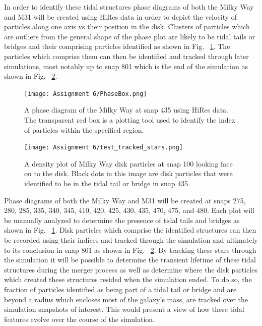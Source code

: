 \documentclass[fleqn,usenatbib]{mnras}
\begin{document}
In order to identify these tidal structures phase diagrams of both the Milky Way and M31 will be created using HiRes data in order to depict the velocity of particles along one axis vs their position in the disk. Clusters of particles which are outliers from the general shape of the phase plot are likely to be tidal tails or bridges and their comprising particles identified as shown in Fig. ~\ref{fig:Phase_box}. The particles which comprise them can then be identified and tracked through later simulations, most notably up to snap 801 which is the end of the simulation as shown in Fig. ~\ref{fig:Tracked_Stars}.

\begin{figure}
	\texttt{[image: Assignment 6/PhaseBox.png]}
    \caption{A phase diagram of the Milky Way at snap 435 using HiRes data. The transparent red box is a plotting tool used to identify the index of particles within the specified region.}
    \label{fig:Phase_box}
\end{figure}

\begin{figure}
	\texttt{[image: Assignment 6/test\_tracked\_stars.png]}
    \caption{A density plot of Milky Way disk particles at snap 100 looking face on to the disk. Black dots in this image are disk particles that were identified to be in the tidal tail or bridge in snap 435.}
    \label{fig:Tracked_Stars}
\end{figure}

 Phase diagrams of both the Milky Way and M31 will be created at snaps 275, 280, 285, 335, 340, 345, 410, 420, 425, 430, 435, 470, 475, and 480. Each plot will be manually analyzed to determine the presence of tidal tails and bridges as shown in Fig. ~\ref{fig:Phase_box}. Disk particles which comprise the identified structures can then be recorded using their indices and tracked through the simulation and ultimately to its conclusion in snap 801 as shown in Fig. ~\ref{fig:Tracked_Stars}. By tracking these stars through the simulation it will be possible to determine the transient lifetime of these tidal structures during the merger process as well as determine where the disk particles which created these structures resided when the simulation ended. To do so, the fraction of particles identified as being part of a tidal tail or bridge and are beyond a radius which encloses most of the galaxy's mass, are tracked over the simulation snapshots of interest. This would present a view of how these tidal features evolve over the course of the simulation.
\end{document}
